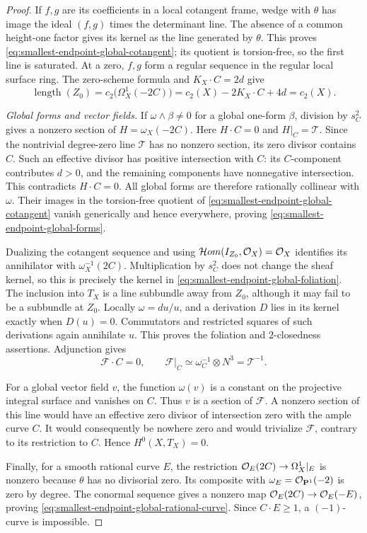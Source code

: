 \begin{proof}
If $f,g$ are its coefficients in a local cotangent frame, wedge
with $\theta$ has image the ideal $(f,g)$ times the determinant
line.  The absence of a common height-one factor gives its kernel
as the line generated by $\theta$.  This proves
\eqref{eq:smallest-endpoint-global-cotangent}; its quotient is
torsion-free, so the first line is saturated.
At a zero, $f,g$ form a regular sequence in the regular local
surface ring.  The zero-scheme formula and $K_X\cdot C=2d$ give
\[
 \operatorname{length}(Z_0)
 =c_2\bigl(\Omega_X^1(-2C)\bigr)
 =c_2(X)-2K_X\cdot C+4d=c_2(X).
\]

\smallskip\noindent
\emph{Global forms and vector fields.}
If $\omega\wedge\beta\ne0$ for a global one-form $\beta$, division
by $s_C^2$ gives a nonzero section of $H=\omega_X(-2C)$.
Here $H\cdot C=0$ and $H|_C=\mathcal T$.
Since the nontrivial degree-zero line $\mathcal T$ has no nonzero
section, its zero divisor contains $C$.  Such an effective divisor
has positive intersection with $C$: its $C$-component contributes
$d>0$, and the remaining components have nonnegative intersection.
This contradicts $H\cdot C=0$.
All global forms are therefore rationally collinear with $\omega$.
Their images in the torsion-free quotient of
\eqref{eq:smallest-endpoint-global-cotangent} vanish generically
and hence everywhere, proving
\eqref{eq:smallest-endpoint-global-forms}.

Dualizing the cotangent sequence and using
$\mathcal Hom(I_{Z_0},\mathcal O_X)=\mathcal O_X$ identifies its annihilator
with $\omega_X^{-1}(2C)$.
Multiplication by $s_C^2$ does not change the sheaf kernel, so
this is precisely the kernel in
\eqref{eq:smallest-endpoint-global-foliation}.
The inclusion into $T_X$ is a line subbundle away from $Z_0$,
although it may fail to be a subbundle at $Z_0$.
Locally $\omega=du/u$, and a derivation $D$ lies in its kernel
exactly when $D(u)=0$.  Commutators and restricted squares of such
derivations again annihilate $u$.  This proves the foliation and
$2$-closedness assertions.  Adjunction gives
\[
 \mathcal F\cdot C=0,\qquad
 \mathcal F|_C\simeq\omega_C^{-1}\otimes N^3
 =\mathcal T^{-1}.
\]

For a global vector field $v$, the function $\omega(v)$ is a
constant on the projective integral surface and vanishes on $C$.
Thus $v$ is a section of $\mathcal F$.
A nonzero section of this line would have an effective zero
divisor of intersection zero with the ample curve $C$.
It would consequently be nowhere zero and would trivialize
$\mathcal F$, contrary to its restriction to $C$.
Hence $H^0(X,T_X)=0$.

Finally, for a smooth rational curve $E$, the restriction
$\mathcal O_E(2C)\to\Omega_X^1|_E$ is nonzero because $\theta$ has no
divisorial zero.  Its composite with
$\omega_E=\mathcal O_{\mathbf P^1}(-2)$ is zero by degree.
The conormal sequence gives a nonzero map
$\mathcal O_E(2C)\to\mathcal O_E(-E)$, proving
\eqref{eq:smallest-endpoint-global-rational-curve}.
Since $C\cdot E\ge1$, a $(-1)$-curve is impossible.
\end{proof}

